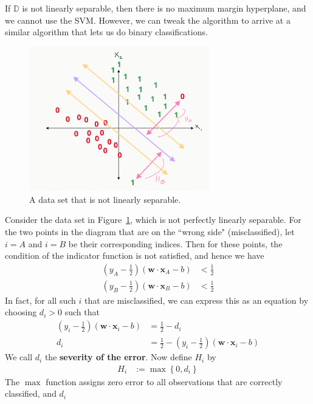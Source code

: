 \documentclass[12pt, a4paper]{article}
\theoremstyle{definition}
\begin{document}
	If $\mathbb{D}$ is not linearly separable, then there is no maximum margin hyperplane,
	and we cannot use the SVM. However, we can tweak the algorithm to arrive at a similar algorithm
	that lets us do binary classifications.
	\begin{figure}
		\centering
		\includegraphics[width=0.7\textwidth]{non-linearly-separable-dataset}
		\caption{A data set that is not linearly separable.}
		\label{fig:non-linearly-separable-D}
	\end{figure}
	Consider the data set in Figure~\ref{fig:non-linearly-separable-D}, which is not
	perfectly linearly separable. For the two points in the diagram that are on the ``wrong side"
	(misclassified), let $i=A$ and $i=B$ be their corresponding indices. Then for these points,
	the condition of the indicator function is not satisfied, and hence we have
	\begin{align*}
		\left(y_A-\frac{1}{2}\right)(\mathbf{w}\cdot\mathbf{x}_A-b)&<\frac{1}{2}\\
		\left(y_B-\frac{1}{2}\right)(\mathbf{w}\cdot\mathbf{x}_B-b)&<\frac{1}{2}
	\end{align*}
	In fact, for all such $i$ that are misclassified, we can express this as an equation
	by choosing $d_i>0$ such that
	\begin{align}
		\left(y_i-\frac{1}{2}\right)(\mathbf{w}\cdot\mathbf{x}_i-b)&=\frac{1}{2}-d_i\nonumber\\
		d_i &= \frac{1}{2}-\left(y_i-\frac{1}{2}\right)(\mathbf{w}\cdot\mathbf{x}_i-b)\label{eqn:hinge_error}
	\end{align}
	We call $d_i$ the \textbf{severity of the error}. Now define $H_i$ by
	\begin{align*}
		H_i &:= \max \left\{
		0, d_i
		\right\}
	\end{align*}
	The $\max$ function assigns zero error to all observations that are correctly classified, and $d_i$
\end{document}
